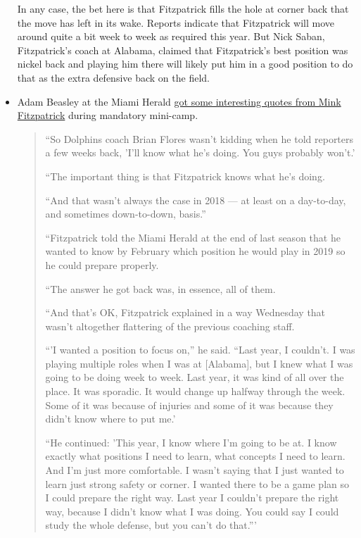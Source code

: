 \documentclass[11pt]{article}
\begin{document}
\begin{itemize}
In any case, the bet here is that Fitzpatrick fills the hole at corner back that the move has left in its wake.  Reports indicate that Fitzpatrick will move around quite a bit week to week as required this year.  But Nick Saban, Fitzpatrick's coach at Alabama, claimed that Fitzpatrick's best position was nickel back and playing him there will likely put him in a good position to do that as the extra defensive back on the field.
\item Adam Beasley at the Miami Herald \href{https://www.miamiherald.com/sports/nfl/miami-dolphins/article231200548.html}{got some interesting quotes from Mink Fitzpatrick} during mandatory mini-camp.  

\begin{quote}
``So Dolphins coach Brian Flores wasn’t kidding when he told reporters a few weeks back, 'I’ll know what he’s doing. You guys probably won’t.'

``The important thing is that Fitzpatrick knows what he’s doing.

``And that wasn’t always the case in 2018 — at least on a day-to-day, and sometimes down-to-down, basis.''

``Fitzpatrick told the Miami Herald at the end of last season that he wanted to know by February which position he would play in 2019 so he could prepare properly.

``The answer he got back was, in essence, all of them.

``And that’s OK, Fitzpatrick explained in a way Wednesday that wasn’t altogether flattering of the previous coaching staff.

``'I wanted a position to focus on,” he said. “Last year, I couldn’t. I was playing multiple roles when I was at [Alabama], but I knew what I was going to be doing week to week. Last year, it was kind of all over the place. It was sporadic. It would change up halfway through the week. Some of it was because of injuries and some of it was because they didn’t know where to put me.'

``He continued: 'This year, I know where I’m going to be at. I know exactly what positions I need to learn, what concepts I need to learn. And I’m just more comfortable. I wasn’t saying that I just wanted to learn just strong safety or corner. I wanted there to be a game plan so I could prepare the right way. Last year I couldn’t prepare the right way, because I didn’t know what I was doing. You could say I could study the whole defense, but you can’t do that.'''
\end{quote}


\end{itemize}
\end{document}
